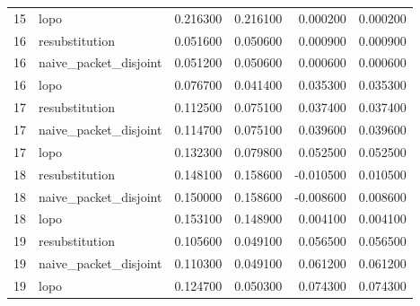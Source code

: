 \begin{table}
\begin{tabular}{rlrrrr}
15 & lopo & 0.216300 & 0.216100 & 0.000200 & 0.000200 \\
16 & resubstitution & 0.051600 & 0.050600 & 0.000900 & 0.000900 \\
16 & naive_packet_disjoint & 0.051200 & 0.050600 & 0.000600 & 0.000600 \\
16 & lopo & 0.076700 & 0.041400 & 0.035300 & 0.035300 \\
17 & resubstitution & 0.112500 & 0.075100 & 0.037400 & 0.037400 \\
17 & naive_packet_disjoint & 0.114700 & 0.075100 & 0.039600 & 0.039600 \\
17 & lopo & 0.132300 & 0.079800 & 0.052500 & 0.052500 \\
18 & resubstitution & 0.148100 & 0.158600 & -0.010500 & 0.010500 \\
18 & naive_packet_disjoint & 0.150000 & 0.158600 & -0.008600 & 0.008600 \\
18 & lopo & 0.153100 & 0.148900 & 0.004100 & 0.004100 \\
19 & resubstitution & 0.105600 & 0.049100 & 0.056500 & 0.056500 \\
19 & naive_packet_disjoint & 0.110300 & 0.049100 & 0.061200 & 0.061200 \\
19 & lopo & 0.124700 & 0.050300 & 0.074300 & 0.074300 \\
\bottomrule
\end{tabular}
\end{table}
